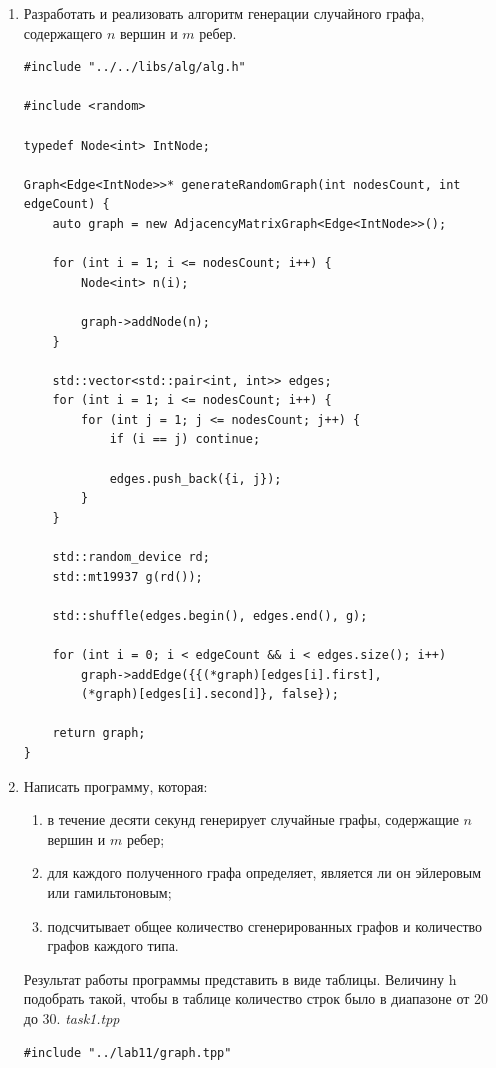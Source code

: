 \documentclass[a4paper,14pt]{extarticle}
\begin{document}
\begin{enumerate}[1.]
    \item Разработать и реализовать алгоритм генерации случайного графа,
          содержащего $n$ вершин и $m$ ребер.\\
          \begin{verbatim}
#include "../../libs/alg/alg.h"

#include <random>

typedef Node<int> IntNode;

Graph<Edge<IntNode>>* generateRandomGraph(int nodesCount, int edgeCount) {
    auto graph = new AdjacencyMatrixGraph<Edge<IntNode>>();

    for (int i = 1; i <= nodesCount; i++) {
        Node<int> n(i);

        graph->addNode(n);
    }

    std::vector<std::pair<int, int>> edges;
    for (int i = 1; i <= nodesCount; i++) {
        for (int j = 1; j <= nodesCount; j++) {
            if (i == j) continue;

            edges.push_back({i, j});
        }
    }

    std::random_device rd;
    std::mt19937 g(rd());

    std::shuffle(edges.begin(), edges.end(), g);

    for (int i = 0; i < edgeCount && i < edges.size(); i++) 
        graph->addEdge({{(*graph)[edges[i].first], 
        (*graph)[edges[i].second]}, false});

    return graph;
}
    \end{verbatim}
    \item Написать программу, которая:\\
          \begin{enumerate}[label=\asbuk*),ref=\asbuk*]
              \item в течение десяти секунд генерирует случайные графы, содержащие $n$ вершин и $m$ ребер;
              \item для каждого полученного графа определяет, является ли он эйлеровым или гамильтоновым;
              \item подсчитывает общее количество сгенерированных графов и количество графов каждого типа.
          \end{enumerate}
          Результат работы программы представить в виде таблицы. Величину h подобрать такой, чтобы в таблице количество
          строк было в диапазоне от 20 до 30.
          \textit{task1.tpp}
          \begin{verbatim}
#include "../lab11/graph.tpp"


\end{verbatim}
\end{enumerate}
\end{document}
